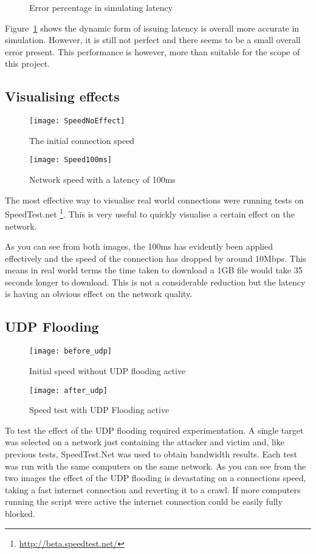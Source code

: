 \begin{center}
	
	\begin{figure}[h]
		\caption{Error percentage in simulating latency}
		\label{ref:latencyAccuracy}
	\end{figure}
\end{center}


Figure~\ref{ref:latencyAccuracy} shows the dynamic form of issuing latency is overall more accurate in simulation. However, it is still not perfect and there seems to be a small overall error present. This performance is however, more than suitable for the scope of this project.

\subsection{Visualising effects}
\begin{wrapfigure}{r}{5cm}
\begin{center}
	\texttt{[image: SpeedNoEffect]}
	\caption{The initial connection speed}
	\texttt{[image: Speed100ms]}
	\caption{Network speed with a latency of 100ms}
\end{center}
\end{wrapfigure}

The most effective way to visualise real world connections were running tests on SpeedTest.net \footnote{\url{http://beta.speedtest.net/}}. This is very useful to quickly visualise a certain effect on the network.

As you can see from both images, the 100ms has evidently been applied effectively and the speed of the connection has dropped by around 10Mbps. This means in real world terms the time taken to download a 1GB file would take 35 seconds longer to download. This is not a considerable reduction but the latency is having an obvious effect on the network quality.


\subsection{UDP Flooding}
\begin{wrapfigure}{r}{5cm}
\begin{center}
	\texttt{[image: before\_udp]}
	\caption{Initial speed without UDP flooding active}
	\texttt{[image: after\_udp]}
	\caption{Speed test with UDP Flooding active}
\end{center}
\end{wrapfigure}

To test the effect of the UDP flooding required experimentation. A single target was selected on a network just containing the attacker and victim and, like previous tests, SpeedTest.Net was used to obtain bandwidth results. Each test was run with the same computers on the same network. As you can see from the two images the effect of the UDP flooding is devastating on a connections speed, taking a fast internet connection and reverting it to a crawl. If more computers running the script were active the internet connection could be easily fully blocked.
